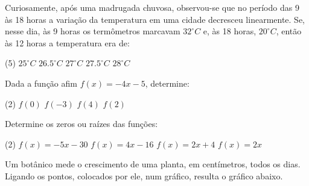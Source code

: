 \documentclass[a4paper,11pt,addpoints]{exam}
\begin{document}
\begin{questions}

    \question[1]

    Curiosamente, após uma madrugada chuvosa, observou-se que no período das 9
    às 18 horas a variação da temperatura em uma cidade decresceu linearmente.
    Se, nesse dia, às 9 horas os termômetros marcavam $32^\circ C$ e, às 18
    horas, $20^\circ C$, então às 12 horas a temperatura era de:

    \begin{tasks}(5)
        \task $25^\circ C$
        \task $26.5^\circ C$
        \task $27^\circ C$
        \task $27.5^\circ C$
        \task $28^\circ C$
    \end{tasks}

    \question[1]

    Dada a função afim $f(x) = -4x -5$, determine:

    \begin{tasks}(2)
        \task $f(0)$
        \task $f(-3)$
        \task $f(4)$
        \task $f(2)$
    \end{tasks}

    \question[1]

    Determine os zeros ou raízes das funções:

    \begin{tasks}(2)
        \task $f(x) = -5x - 30$
        \task $f(x) = 4x - 16$
        \task $f(x) = 2x + 4$
        \task $f(x) = 2x$
    \end{tasks}

    \question[1]

    Um botânico mede o crescimento de uma planta, em centímetros, todos os dias.
    Ligando os pontos, colocados por ele, num gráfico, resulta o gráfico abaixo.

    \begin{center}
    \end{center}


\end{questions}
\end{document}
